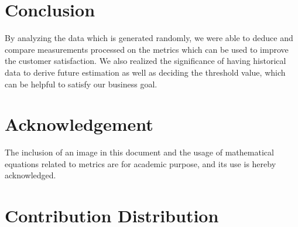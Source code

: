 \documentclass[a4paper, 11pt]{article}
\begin{document}
\section{Conclusion} 
By analyzing the data which is generated randomly, we were able to deduce and compare measurements processed on the metrics which can be used to improve the customer satisfaction. We also realized the significance of having historical data to derive future estimation as well as deciding the threshold value, which can be helpful to satisfy our business goal. \\
\section{Acknowledgement}
The inclusion of an image in this document and the usage of mathematical equations related to metrics are for academic purpose, and its use is hereby acknowledged.  

\section{Contribution Distribution}
\end{document}
